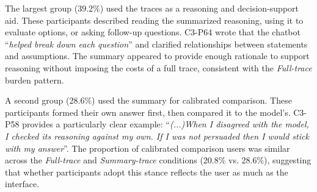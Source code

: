 \documentclass[acmlarge,review=true, anonymous=true]{acmart}
\begin{document}
The largest group (39.2\%) used the traces as a reasoning and decision-support aid. These participants described reading the summarized reasoning, using it to evaluate options, or asking follow-up questions. C3-P64 wrote that the chatbot ``\textit{helped break down each question}'' and clarified relationships between statements and assumptions. The summary appeared to provide enough rationale to support reasoning without imposing the costs of a full trace, consistent with the \textit{Full-trace} burden pattern.


A second group (28.6\%) used the summary for calibrated comparison. These participants formed their own answer first, then compared it to the model's. C3-P58 provides a particularly clear example: ``\textit{(...)When I disagreed with the model, I checked its reasoning against my own. If I was not persuaded then I would stick with my answer}''. The proportion of calibrated comparison users was similar across the \textit{Full-trace} and \textit{Summary-trace} conditions (20.8\% vs. 28.6\%), suggesting that whether participants adopt this stance reflects the user as much as the interface.

\end{document}
